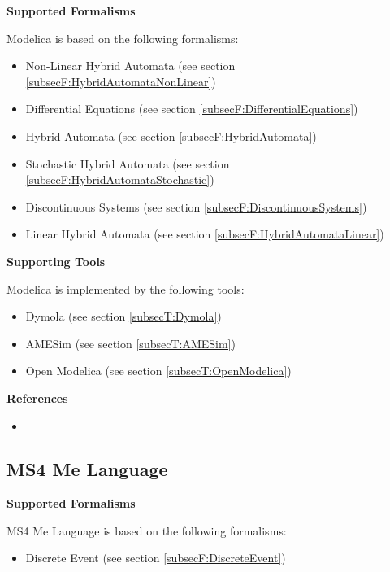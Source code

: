 \textbf{Supported Formalisms}

Modelica is based on the following formalisms:
\begin{itemize}
	\item Non-Linear Hybrid Automata (see section \ref{subsecF:HybridAutomataNonLinear})
	\item Differential Equations (see section \ref{subsecF:DifferentialEquations})
	\item Hybrid Automata (see section \ref{subsecF:HybridAutomata})
	\item Stochastic Hybrid Automata (see section \ref{subsecF:HybridAutomataStochastic})
	\item Discontinuous Systems (see section \ref{subsecF:DiscontinuousSystems})
	\item Linear Hybrid Automata (see section \ref{subsecF:HybridAutomataLinear})
\end{itemize}


\textbf{Supporting Tools}

Modelica is implemented by the following tools:
\begin{itemize}
	\item Dymola (see section \ref{subsecT:Dymola})
	\item AMESim (see section \ref{subsecT:AMESim})
	\item Open Modelica (see section \ref{subsecT:OpenModelica})
\end{itemize}


\textbf{References}
\begin{itemize}
	
\item {}
\end{itemize}



\subsection{MS4 Me Language}
\label{subsecL:MS4MeLanguage}



\textbf{Supported Formalisms}

MS4 Me Language is based on the following formalisms:
\begin{itemize}
	\item Discrete Event (see section \ref{subsecF:DiscreteEvent})
\end{itemize}


